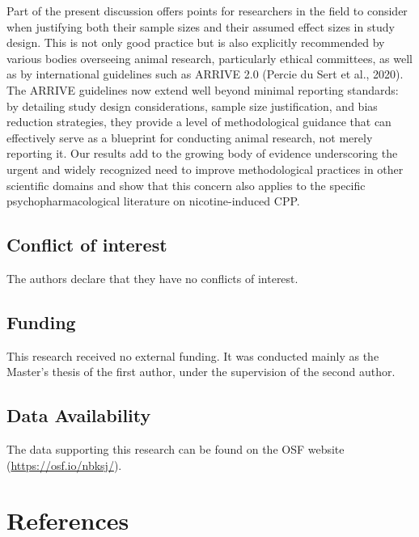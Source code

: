 \documentclass[authordate, meta]{jote-new-article}
\begin{document}
	Part of the present discussion offers points for researchers in the field to consider when justifying both their sample sizes and their assumed effect sizes in study design. This is not only good practice but is also explicitly recommended by various bodies overseeing animal research, particularly ethical committees, as well as by international guidelines such as ARRIVE 2.0 (Percie du Sert et al., 2020). The ARRIVE guidelines now extend well beyond minimal reporting standards: by detailing study design considerations, sample size justification, and bias reduction strategies, they provide a level of methodological guidance that can effectively serve as a blueprint for conducting animal research, not merely reporting it. Our results add to the growing body of evidence underscoring the urgent and widely recognized need to improve methodological practices in other scientific domains and show that this concern also applies to the specific psychopharmacological literature on nicotine-induced CPP.



	\subsection{Conflict of interest}



	The authors declare that they have no conflicts of interest.



	\subsection{Funding}



	This research received no external funding. It was conducted mainly as the Master's thesis of the first author, under the supervision of the second author.



	\subsection{Data Availability}



	The data supporting this research can be found on the OSF website (\url{https://osf.io/nbksj/}).







	\section{References}
\end{document}
